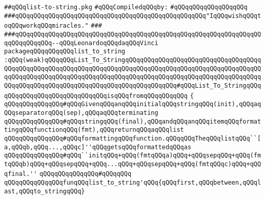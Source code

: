 \label{src/lib/src/list-to-string.pkg}
\verb|##qQQqlist-to-string.pkg|\newline
\newline
\verb|#qQQqCompiledqQQqby:|\newline
\verb|#qQQqqQQqqQQqqQQqqQQq|\newline
\newline
\newline
\newline
\verb|###qQQqqQQqqQQqqQQqqQQqqQQqqQQqqQQqqQQqqQQqqQQqqQQqqQQq"IqQQqwishqQQqtoqQQqworkqQQqmiracles."|\newline
\verb|###|\newline
\verb|###qQQqqQQqqQQqqQQqqQQqqQQqqQQqqQQqqQQqqQQqqQQqqQQqqQQqqQQqqQQqqQQqqQQqqQQqqQQqqQQq--qQQqLeonardoqQQqdaqQQqVinci|\newline
\newline
\newline
\newline
\verb|packageqQQqqQQqqQQqlist_to_string|\newline
\verb|:qQQq(weak)qQQqqQQqList_To_StringqQQqqQQqqQQqqQQqqQQqqQQqqQQqqQQqqQQqqQQqqQQqqQQqqQQqqQQqqQQqqQQqqQQqqQQqqQQqqQQqqQQqqQQqqQQqqQQqqQQqqQQqqQQqqQQqqQQqqQQqqQQqqQQqqQQqqQQqqQQqqQQqqQQqqQQqqQQqqQQqqQQqqQQqqQQqqQQqqQQqqQQqqQQqqQQqqQQqqQQqqQQqqQQqqQQqqQQqqQQqqQQq#qQQqList_To_StringqQQqqQQqqQQqqQQqqQQqqQQqqQQqqQQqisqQQqfromqQQqqQQqqQQq|\newline
\verb|{|\newline
\verb|qQQqqQQqqQQqqQQq#qQQqGivenqQQqanqQQqinitialqQQqstringqQQq(init),qQQqaqQQqseparatorqQQq(sep),qQQqaqQQqterminating|\newline
\verb|qQQqqQQqqQQqqQQq#qQQqstringqQQq(final),qQQqandqQQqanqQQqitemqQQqformattingqQQqfunctionqQQq(fmt),qQQqreturnqQQqaqQQqlist|\newline
\verb|qQQqqQQqqQQqqQQq#qQQqformattingqQQqfunction.qQQqqQQqTheqQQqlistqQQq``[a,qQQqb,qQQq...,qQQqc]''qQQqgetsqQQqformattedqQQqas|\newline
\verb|qQQqqQQqqQQqqQQq#qQQq``initqQQq+qQQq(fmtqQQqa)qQQq+qQQqsepqQQq+qQQq(fmtqQQqb)qQQq+qQQqsepqQQq+qQQq...qQQq+qQQqsepqQQq+qQQq(fmtqQQqc)qQQq+qQQqfinal.''|\newline
\verb|qQQqqQQqqQQqqQQq#qQQqqQQq|\newline
\verb|qQQqqQQqqQQqqQQqfunqQQqlist_to_string'qQQq{qQQqfirst,qQQqbetween,qQQqlast,qQQqto_stringqQQq}|\newline
